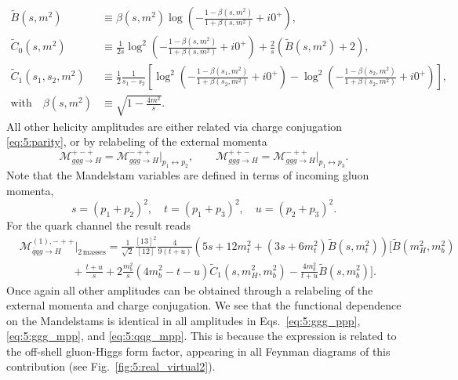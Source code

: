 \begin{equation}
\begin{split}
\tilde{B}\!(s, m^2) &\equiv \beta(s, m^2) \log\!\left(- \frac{1 - \beta(s, m^2)}{1 + \beta(s, m^2)} + i 0^+ \right), \\
\tilde{C}_0\!(s, m^2) &\equiv \frac{1}{2 s} \log^2\!\left(- \frac{1 - \beta(s, m^2)}{1 + \beta(s, m^2)} + i 0^+ \right) + \frac{2}{s} \left(\tilde{B}\!(s, m^2) + 2 \right), \\
\tilde{C}_1\!(s_1, s_2, m^2) &\equiv \frac{1}{2} \frac{1}{s_1 - s_2} \left[ \log^2\!\left(-\frac{1 - \beta(s_1, m^2)}{1 + \beta(s_2, m^2)} + i 0^+ \right) - \log^2\!\left(- \frac{1 - \beta(s_2, m^2)}{1 + \beta(s_2, m^2)} + i0^+\right) \right], \\
\text{with} \quad \beta(s, m^2) &\equiv \sqrt{1 - \frac{4 m^2}{s}}.
\label{eq:5:function_definitions}
\end{split}
\end{equation}
All other helicity amplitudes are either related via charge conjugation \eqref{eq:5:parity}, or by relabeling of the external momenta
\begin{equation}
\mathcal{M}_{ggg \rightarrow H}^{+-+} = \mathcal{M}_{ggg \rightarrow H}^{-++} \bigg \vert_{p_1 \leftrightarrow p_2}, \qquad \mathcal{M}_{ggg \rightarrow H}^{++-} = \mathcal{M}_{ggg \rightarrow H}^{-++} \bigg \vert_{p_1 \leftrightarrow p_3}.
\label{eq:5:momentum_exchange}
\end{equation}
Note that the Mandelstam variables are defined in terms of incoming gluon momenta, \ie\
\begin{equation}
s = (p_1 + p_2)^2, \quad t = (p_1 + p_3)^2, \quad u = (p_2 + p_3)^2.
\end{equation}
For the quark channel the result reads
\begin{equation}
\begin{split}
&\mathcal{M}_{\bar{q}q g \rightarrow H}^{(1),-++} \bigg \vert_{2\, \text{masses}} =  \frac{1}{\sqrt{2}} \frac{[13]^2}{[12]}  \frac{4 }{9 (t + u)} \left(5 s + 12 m_t^2 + (3 s + 6 m_t^2) \tilde{B}\!(s, m_t^2) \right)\bigg [\tilde{B}\!(m_H^2, m_b^2) \\
& \hspace{2cm}  + \frac{t + u}{s} + 2 \frac{m_b^2}{s} \left(4m_b^2 - t - u  \right) \tilde{C}_1\!(s, m_H^2, m_b^2) - \frac{4 m_b^2}{t + u}\tilde{B}\!(s, m_b^2) \bigg ].
\label{eq:5:qqg_mpp}
\end{split}
\end{equation}
Once again all other amplitudes can be obtained through a relabeling of the external momenta and charge conjugation. We see that the functional dependence on the Mandelstams is identical in all amplitudes in Eqs.~\eqref{eq:5:ggg_ppp}, \eqref{eq:5:ggg_mpp}, and \eqref{eq:5:qqg_mpp}. This is because the expression is related to the off-shell gluon-Higgs form factor, appearing in all Feynman diagrams of this contribution (see Fig.~\ref{fig:5:real_virtual2}).

